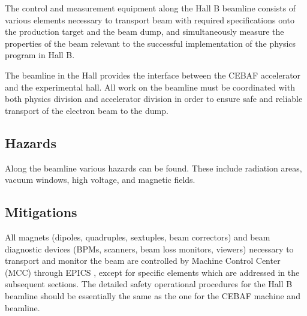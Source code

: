 

The control and measurement equipment along the Hall B beamline consists of various elements necessary to transport beam with required specifications onto the production target and the beam dump, and simultaneously measure the properties of the beam relevant to the successful implementation of the physics program in Hall B. 

The beamline in the Hall provides the interface between the CEBAF accelerator and the experimental hall. All work on the beamline must be coordinated with both physics division and accelerator division in order to ensure safe and reliable transport of the electron beam to the dump.

\subsection{Hazards} 

Along the beamline various hazards can be found. These include radiation areas, vacuum windows, high voltage, and magnetic fields.

\subsection{Mitigations}

\indent

All magnets (dipoles, quadruples, sextuples, beam correctors) and beam diagnostic devices (BPMs, scanners, beam loss monitors, viewers) necessary to transport and monitor the beam are controlled by Machine Control Center (MCC) through EPICS \cite{EPICSwww}, except for specific elements which are addressed in the subsequent sections. The detailed safety operational procedures for the Hall B beamline should be essentially the same as the one for the CEBAF machine and beamline.

